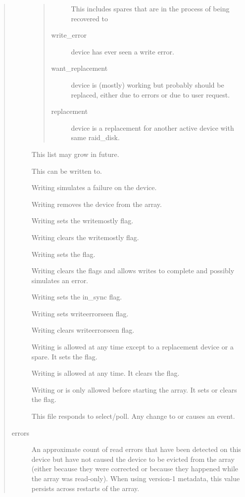 \documentclass[a4paper,8pt,english]{sphinxmanual}
\begin{document}
\begin{quote}
\begin{description}
\begin{quote}
\begin{description}
This includes spares that are in the process
of being recovered to

\item[{write\_error}] \leavevmode
device has ever seen a write error.

\item[{want\_replacement}] \leavevmode
device is (mostly) working but probably
should be replaced, either due to errors or
due to user request.

\item[{replacement}] \leavevmode
device is a replacement for another active
device with same raid\_disk.

\end{description}
\end{quote}

This list may grow in future.

This can be written to.

Writing   simulates a failure on the device.

Writing  removes the device from the array.

Writing  sets the writemostly flag.

Writing  clears the writemostly flag.

Writing  sets the  flag.

Writing  clears the  flags and allows writes
to complete and possibly simulates an error.

Writing  sets the in\_sync flag.

Writing  sets writeerrorseen flag.

Writing  clears writeerrorseen flag.

Writing  is allowed at any time except to a
replacement device or a spare.  It sets the flag.

Writing  is allowed at any time.  It clears
the flag.

Writing  or  is only allowed before
starting the array.  It sets or clears the flag.

This file responds to select/poll. Any change to 
or  causes an event.

\item[{errors}] \leavevmode
An approximate count of read errors that have been detected on
this device but have not caused the device to be evicted from
the array (either because they were corrected or because they
happened while the array was read-only).  When using version-1
metadata, this value persists across restarts of the array.


\end{description}
\end{quote}
\end{document}
